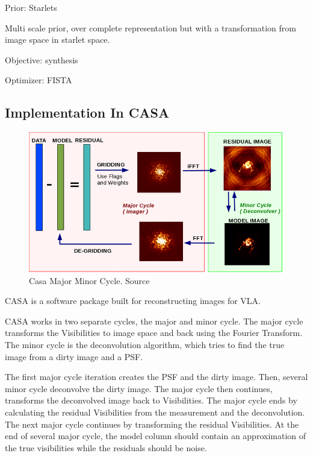 Prior: Starlets

Multi scale prior,  over complete representation but with a transformation from image space in starlet space.


Objective: synthesis

Optimizer: FISTA

\pagebreak
\subsection{Implementation In CASA}

\begin{figure}
	\centering
	\vspace{-15pt}
	\includegraphics[width=0.9\linewidth]{./chapters/04.cs/img/casa_major_minor.png}
	\caption{Casa Major Minor Cycle. Source \cite{casa2018major}}
	\label{cs:major}
	\vspace{-10pt}
\end{figure}

CASA is a software package built for reconstructing images for VLA. 

CASA works in two separate cycles, the major and minor cycle. The major cycle transforms the Visibilities to image space and back using the Fourier Transform. The minor cycle is the deconvolution algorithm, which tries to find the true image from a dirty image and a PSF. 

The first major cycle iteration creates the PSF and the dirty image. Then, several minor cycle deconvolve the dirty image. The major cycle then continues, transforms the deconvolved image back to Visibilities. The major cycle ends by calculating the residual Visibilities from the measurement and the deconvolution. The next major cycle continues by transforming the residual Visibilities. At the end of several major cycle, the model column should contain an approximation of the true visibilities while the residuals should be noise. %

